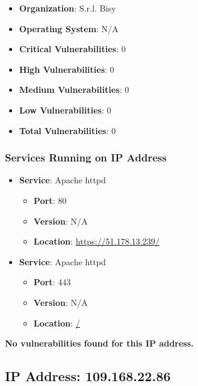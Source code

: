 \documentclass{article}
\begin{document}
\begin{itemize}
    \item \textbf{Organization}: S.r.l. Bisy
    \item \textbf{Operating System}:  N/A 
    \item \textbf{Critical Vulnerabilities}: 0
    \item \textbf{High Vulnerabilities}: 0
    \item \textbf{Medium Vulnerabilities}: 0
    \item \textbf{Low Vulnerabilities}: 0
    \item \textbf{Total Vulnerabilities}: 0
\end{itemize}

\subsubsection*{Services Running on IP Address}

\begin{itemize}
    
        \item \textbf{Service}: Apache httpd
        \begin{itemize}
            \item \textbf{Port}: 80
            \item \textbf{Version}:  N/A 
            \item \textbf{Location}: \href{ https://51.178.13.239/ }{ https://51.178.13.239/ }
        \end{itemize}
    
        \item \textbf{Service}: Apache httpd
        \begin{itemize}
            \item \textbf{Port}: 443
            \item \textbf{Version}:  N/A 
            \item \textbf{Location}: \href{ / }{ / }
        \end{itemize}
    
\end{itemize}


\textbf{No vulnerabilities found for this IP address.}




\clearpage



\subsection*{IP Address: 109.168.22.86}
\end{document}
